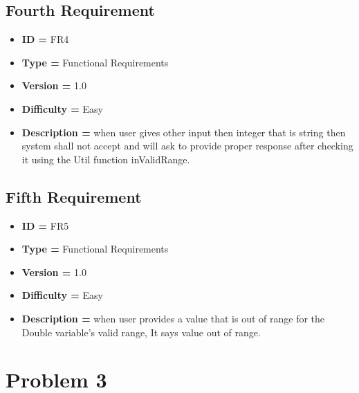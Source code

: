 \documentclass[a4paper, 11pt]{article}
\begin{document}
    \subsection*{Fourth  Requirement}
    \begin{itemize}
        \item \textbf{ID = } FR4
        \item \textbf{Type = } Functional Requirements
        \item \textbf{Version = } 1.0
        \item \textbf{Difficulty = } Easy
        \item \textbf{Description = }when user gives other input then integer that is string then system shall not accept and will ask to provide proper response after checking it using the Util function inValidRange.
    \end{itemize}
        \subsection*{Fifth  Requirement}
    \begin{itemize}
        \item \textbf{ID = } FR5
        \item \textbf{Type = } Functional Requirements
        \item \textbf{Version = } 1.0
        \item \textbf{Difficulty = } Easy
        \item \textbf{Description = }when user provides a value that is out of range for the Double variable's valid range, It says value out of range.
    \end{itemize}

\newpage
\section*{Problem 3}
\end{document}
